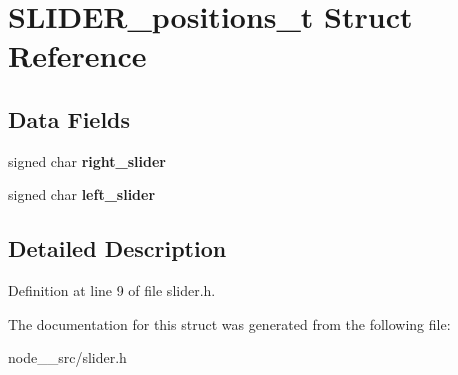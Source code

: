 \hypertarget{structSLIDER__positions__t}{}\section{S\+L\+I\+D\+E\+R\+\_\+positions\+\_\+t Struct Reference}
\label{structSLIDER__positions__t}
\subsection*{Data Fields}
\begin{DoxyCompactItemize}
\item 
signed char {\bfseries right\+\_\+slider}\hypertarget{structSLIDER__positions__t_a83ba6b0c7a0fc2276d27dba50e70c1b2}{}\label{structSLIDER__positions__t_a83ba6b0c7a0fc2276d27dba50e70c1b2}

\item 
signed char {\bfseries left\+\_\+slider}\hypertarget{structSLIDER__positions__t_acc6e80420e2a84c2a9bd884983939717}{}\label{structSLIDER__positions__t_acc6e80420e2a84c2a9bd884983939717}

\end{DoxyCompactItemize}


\subsection{Detailed Description}


Definition at line 9 of file slider.\+h.



The documentation for this struct was generated from the following file\+:\begin{DoxyCompactItemize}
\item 
node\+\_\+\_\+src/slider.\+h\end{DoxyCompactItemize}
